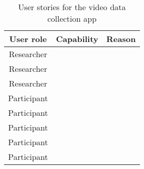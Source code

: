 \begin{table}[!ht]
\renewcommand{\arraystretch}{1.2}
\begin{tabularx}{\textwidth}{|c|X|X|}
\hline
User role   & Capability & Reason \\ \hline
Researcher  &            &        \\ \hline
Researcher  &            &        \\ \hline
Researcher  &            &        \\ \hline
Participant &            &        \\ \hline
Participant &            &        \\ \hline
Participant &            &        \\ \hline
Participant &            &        \\ \hline
Participant &            &        \\ \hline
\end{tabularx}
\caption{User stories for the video data collection app}
\label{tab:User stories}
\end{table}